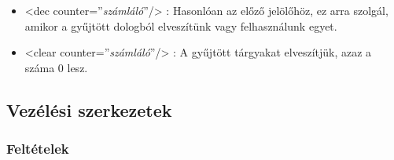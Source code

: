 \documentclass[12pt,a4paper,oneside]{report}
\newcommand{\xtag}[1]{{\color{Tag}#1}}
\newcommand{\xattr}[2]{{\color{Attr}#1}={\color{Value}''#2''}}
\begin{document}
\begin{itemize}
        \item <\xtag{dec} \xattr{counter}{\emph{számláló}}/>           
          : Hasonlóan az előző jelölőhöz, ez arra szolgál, amikor a
          gyűjtött dologból elveszítünk vagy felhasználunk egyet.

        \item <\xtag{clear} \xattr{counter}{\emph{számláló}}/>            
          : A gyűjtött tárgyakat elveszítjük, azaz a száma 0 lesz.
      \end{itemize}

    \subsection{Vezélési szerkezetek}
      \subsubsection{Feltételek}
\end{document}
